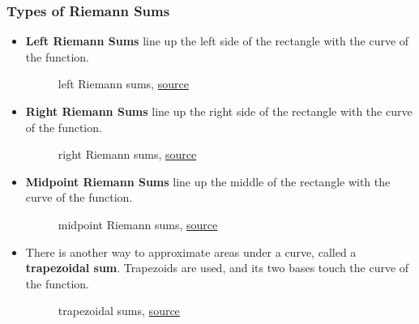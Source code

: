 \documentclass[12pt]{article}
\begin{document}
\subsubsection{Types of Riemann Sums}
\begin{itemize}
    \item \textbf{Left Riemann Sums} line up the left side of the rectangle with the curve of the function.
          \begin{figure}[H]
              \begin{center}
                  \caption{left Riemann sums, \href{https://www.khanacademy.org/math/ap-calculus-bc/bc-integration-new/bc-6-2/a/riemann-sums-review?modal=1}{source}}
              \end{center}
          \end{figure}

    \item \textbf{Right Riemann Sums} line up the right side of the rectangle with the curve of the function.
          \begin{figure}[H]
              \begin{center}
                  \caption{right Riemann sums, \href{https://www.khanacademy.org/math/ap-calculus-bc/bc-integration-new/bc-6-2/a/riemann-sums-review?modal=1}{source}}
              \end{center}
          \end{figure}

    \item \textbf{Midpoint Riemann Sums} line up the middle of the rectangle with the curve of the function.
          \begin{figure}[H]
              \begin{center}
                  \caption{midpoint Riemann sums, \href{https://www.khanacademy.org/math/ap-calculus-bc/bc-integration-new/bc-6-2/a/riemann-sums-review?modal=1}{source}}
              \end{center}
          \end{figure}

    \item There is another way to approximate areas under a curve, called a \textbf{trapezoidal sum}. Trapezoids are used, and its two bases touch the curve of the function.
          \begin{figure}[H]
              \begin{center}
                  \caption{trapezoidal sums, \href{https://www.khanacademy.org/math/ap-calculus-bc/bc-integration-new/bc-6-2/a/riemann-sums-review?modal=1}{source}}
              \end{center}
          \end{figure}
\end{itemize}
\end{document}
